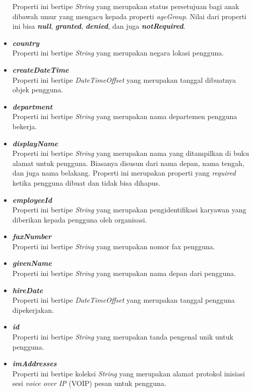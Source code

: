 \begin{itemize}
	Properti ini bertipe \textit{String} yang merupakan status persetujuan bagi anak dibawah umur yang mengacu kepada properti \textit{ageGroup}. Nilai dari properti ini bisa \textbf{\textit{null}}, \textbf{\textit{granted}}, \textbf{\textit{denied}}, dan juga \textbf{\textit{notRequired}}. 
	\item \textbf{\textit{country}}\\
	Properti ini bertipe \textit{String} yang merupakan negara lokasi pengguna.
	\item \textbf{\textit{createDateTime}}\\
	Properti ini bertipe \textit{DateTimeOffset} yang merupakan tanggal dibuatnya objek pengguna.
	\item \textbf{\textit{department}}\\
	Properti ini bertipe \textit{String} yang merupakan nama departemen pengguna bekerja.
	\item \textbf{\textit{displayName}}\\
	Properti ini bertipe \textit{String} yang merupakan nama yang ditampilkan di buku alamat untuk pengguna. Biasanya disusun dari nama depan, nama tengah, dan juga nama belakang. Properti ini merupakan properti yang \textit{required} ketika pengguna dibuat dan tidak bisa dihapus. 
	 \item \textbf{\textit{employeeId}}\\
	Properti ini bertipe \textit{String} yang merupakan pengidentifikasi karyawan yang diberikan kepada pengguna oleh organisasi.
	\item \textbf{\textit{faxNumber}}\\
	Properti ini bertipe \textit{String} yang merupakan nomor fax pengguna.
	\item \textbf{\textit{givenName}}\\
	Properti ini bertipe \textit{String} yang merupakan nama depan dari pengguna.
	\item \textbf{\textit{hireDate}}\\
	Properti ini bertipe \textit{DateTimeOffset} yang merupakan tanggal pengguna dipekerjakan.
	\item \textbf{\textit{id}}\\
	Properti ini bertipe \textit{String} yang merupakan tanda pengenal unik untuk pengguna.
	\item \textbf{\textit{imAddresses}}\\
	Properti ini bertipe koleksi \textit{String} yang merupakan alamat protokol inisiasi sesi \textit{voice over IP} (VOIP) pesan untuk pengguna.

\end{itemize}
